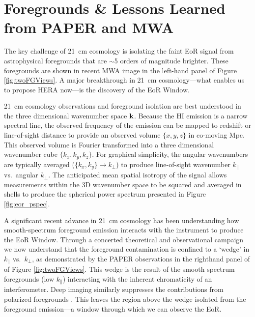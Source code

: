 \documentclass[preprint]{aastex}
\def\kperp{k_{\bot}}
\def\kpar{k_{\|}}
\def\k{{\bf k}}
\def\HI{{H{\small I }}}
\begin{document}
\vspace{-0.25in}
\section{Foregrounds \& Lessons Learned from PAPER and MWA}
\label{LessonsSec}

The key challenge of 21~cm cosmology is isolating the faint EoR signal from
astrophysical foregrounds that are $\sim$5 orders of magnitude brighter. These foregrounds
are shown in recent MWA image 
in the left-hand panel of Figure \ref{fig:twoFGViews}. A major breakthrough in
21~cm cosmology---what enables us to propose HERA now---is the discovery of the
EoR Window.

21~cm cosmology observations and foreground isolation are best understood in
the three dimensional wavenumber space $\k$.  Because the \HI emission is a
narrow spectral line, the observed frequency of the emission can be mapped to
redshift or line-of-sight distance to provide an observed volume $\{x,y,z\}$ in
co-moving Mpc. This observed volume is Fourier transformed into a three dimensional
wavenumber cube $\{k_{x}, k_{y}, k_{z}\}$. For graphical simplicity, the angular
wavenumbers are typically averaged ($\{k_{x},k_{y}\}\rightarrow\kperp$) to
produce line-of-sight wavenumber $\kpar$ vs.\ angular $\kperp$. 
The anticipated mean spatial isotropy of the signal allows measurements within the 3D wavenumber space to be
squared and averaged in shells to produce the spherical power spectrum
presented in Figure \ref{fig:eor_pspec}.

A significant recent advance in 21~cm cosmology has been understanding how smooth-spectrum
foreground emission interacts with the instrument to produce the EoR Window.
Through a concerted theoretical and observational campaign
\citep{morales_et_al2012,parsons_et_al2012b,vedantham_2012,Datta_2010,hazelton_et_al2013,pober_et_al2013,parsons_et_al2013,dillon_et_al2013b_trunc}
we now understand that the foreground contamination is confined to a `wedge' in
$\kpar$ vs.\ $\kperp$, as demonstrated by the PAPER observations in the
righthand panel of of Figure \ref{fig:twoFGViews}. This wedge is the result of
the smooth spectrum foregrounds (low $\kpar$) interacting with the inherent
chromaticity of an interferometer. Deep imaging similarly suppresses the 
contributions from polarized foregrounds \citep{bernardi_2013_trunc,moore_et_al2013}. 
This leaves the region above the wedge isolated from the
foreground emission---a window through which we can observe the EoR.
\end{document}
